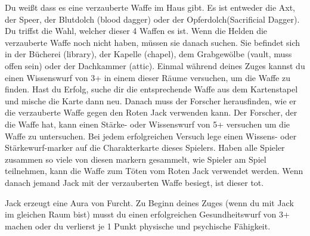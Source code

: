 \begin{itemize}
    \bitem Du weißt dass es eine verzauberte Waffe im Haus gibt. Es ist entweder die Axt, der Speer, der Blutdolch (blood dagger) oder der Opferdolch(Sacrificial Dagger).
   Du triffst die Wahl, welcher dieser 4 Waffen es ist.
    \bitem Wenn die Helden die verzauberte Waffe noch nicht haben, müssen sie danach suchen. Sie befindet sich in der Bücherei (library), der Kapelle (chapel), dem Grabgewölbe (vault, muss offen sein) oder der Dachkammer (attic). Einmal während deines Zuges kannst du einen Wissenswurf von 3+ in einem dieser Räume versuchen, um die Waffe zu finden. Hast du Erfolg, suche dir die entsprechende Waffe aus dem Kartenstapel und mische die Karte dann neu.
    \bitem Danach muss der Forscher herausfinden, wie er die verzauberte Waffe gegen den Roten Jack verwenden kann. Der Forscher, der die Waffe hat, kann einen Stärke- oder Wissenswurf von 5+ versuchen um die Waffe zu untersuchen. Bei jedem erfolgreichen Versuch lege einen Wissens- oder Stärkewurf-marker auf die Charakterkarte dieses Spielers. Haben alle Spieler zusammen so viele von diesen markern gesammelt, wie Spieler am Spiel teilnehmen, kann die Waffe zum Töten vom Roten Jack verwendet werden.
    \bitem Wenn danach jemand Jack mit der verzauberten Waffe besiegt, ist dieser tot.

\end{itemize}

Jack erzeugt eine Aura von Furcht. Zu Beginn deines Zuges (wenn du mit Jack im gleichen Raum bist) musst du einen erfolgreichen Gesundheitswurf von 3+ machen oder du verlierst je 1 Punkt physische und psychische Fähigkeit.


